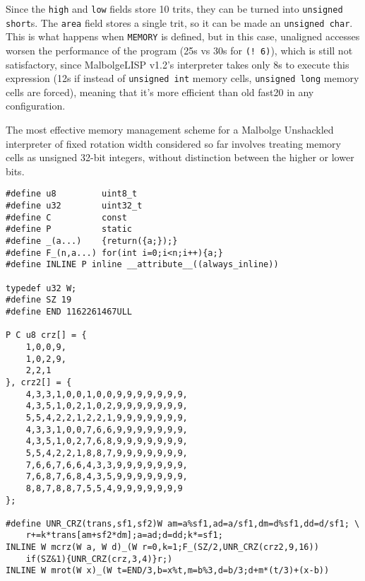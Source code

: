 \par Since the \verb|high| and \verb|low| fields store 10 trits, they can be turned into \verb|unsigned short|s. The \verb|area| field stores a single trit, so it can be made an \verb|unsigned char|. This is what happens when \verb|MEMORY| is defined, but in this case, unaligned accesses worsen the performance of the program (25s vs 30s for \verb|(! 6)|), which is still not satisfactory, since MalbolgeLISP v1.2's interpreter takes only 8s to execute this expression (12s if instead of \verb|unsigned int| memory cells, \verb|unsigned long| memory cells are forced), meaning that it's more efficient than old fast20 in any configuration.

\par The most effective memory management scheme for a Malbolge Unshackled interpreter of fixed rotation width considered so far involves treating memory cells as unsigned 32-bit integers, without distinction between the higher or lower bits.

\begin{verbatim}
#define u8         uint8_t
#define u32        uint32_t
#define C          const
#define P          static
#define _(a...)    {return({a;});}
#define F_(n,a...) for(int i=0;i<n;i++){a;}
#define INLINE P inline __attribute__((always_inline))

typedef u32 W;
#define SZ 19
#define END 1162261467ULL

P C u8 crz[] = {
    1,0,0,9,
    1,0,2,9,
    2,2,1
}, crz2[] = {
    4,3,3,1,0,0,1,0,0,9,9,9,9,9,9,9,
    4,3,5,1,0,2,1,0,2,9,9,9,9,9,9,9,
    5,5,4,2,2,1,2,2,1,9,9,9,9,9,9,9,
    4,3,3,1,0,0,7,6,6,9,9,9,9,9,9,9,
    4,3,5,1,0,2,7,6,8,9,9,9,9,9,9,9,
    5,5,4,2,2,1,8,8,7,9,9,9,9,9,9,9,
    7,6,6,7,6,6,4,3,3,9,9,9,9,9,9,9,
    7,6,8,7,6,8,4,3,5,9,9,9,9,9,9,9,
    8,8,7,8,8,7,5,5,4,9,9,9,9,9,9,9
};

#define UNR_CRZ(trans,sf1,sf2)W am=a%sf1,ad=a/sf1,dm=d%sf1,dd=d/sf1; \
    r+=k*trans[am+sf2*dm];a=ad;d=dd;k*=sf1;
INLINE W mcrz(W a, W d)_(W r=0,k=1;F_(SZ/2,UNR_CRZ(crz2,9,16))
    if(SZ&1){UNR_CRZ(crz,3,4)}r;)
INLINE W mrot(W x)_(W t=END/3,b=x%t,m=b%3,d=b/3;d+m*(t/3)+(x-b))
\end{verbatim}

